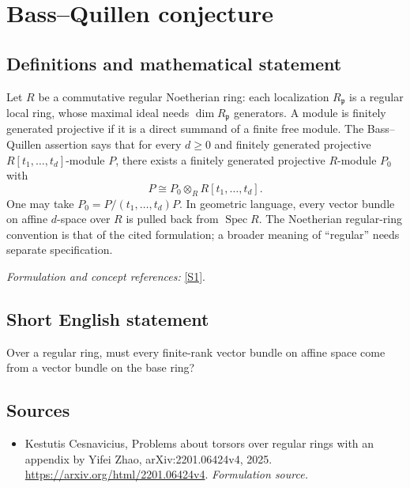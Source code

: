 \documentclass[11pt]{article}
\begin{document}
\section*{\texorpdfstring{Bass–Quillen conjecture}{Bass–Quillen conjecture}}\label{7200003}
\subsection{Definitions and mathematical statement}
Let $R$ be a commutative regular Noetherian ring: each localization $R_{\mathfrak p}$ is a regular local ring, whose maximal ideal needs $\dim R_{\mathfrak p}$ generators. A module is finitely generated projective if it is a direct summand of a finite free module. The Bass--Quillen assertion says that for every $d\ge0$ and finitely generated projective $R[t_1,\ldots,t_d]$-module $P$, there exists a finitely generated projective $R$-module $P_0$ with
\[
 P\cong P_0\otimes_R R[t_1,\ldots,t_d].
\]
One may take $P_0=P/(t_1,\ldots,t_d)P$. In geometric language, every vector bundle on affine $d$-space over $R$ is pulled back from $\operatorname{Spec}R$. The Noetherian regular-ring convention is that of the cited formulation; a broader meaning of ``regular'' needs separate specification.
\par\smallskip\textit{Formulation and concept references:} \href{https://arxiv.org/html/2201.06424v4}{[S1]}.

\subsection{Short English statement}
Over a regular ring, must every finite-rank vector bundle on affine space come from a vector bundle on the base ring?
\subsection{Sources}
\begin{itemize}
\item[S1]Kestutis Cesnavicius, Problems about torsors over regular rings with an appendix by Yifei Zhao, arXiv:2201.06424v4, 2025.
\url{https://arxiv.org/html/2201.06424v4}.
\textit{Formulation source.}
\end{itemize}
\end{document}

